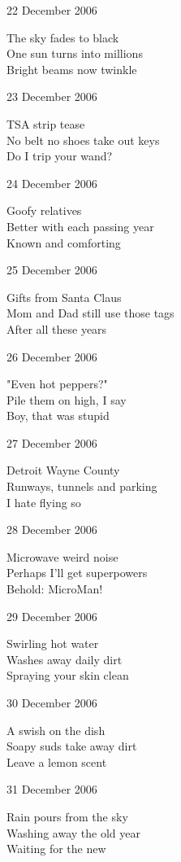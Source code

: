 \documentclass[12pt]{article}
\begin{document}
22 December 2006

The sky fades to black \\
One sun turns into millions \\
Bright beams now twinkle

23 December 2006

TSA strip tease \\
No belt no shoes take out keys \\
Do I trip your wand?

24 December 2006

Goofy relatives \\
Better with each passing year \\
Known and comforting

25 December 2006

Gifts from Santa Claus \\
Mom and Dad still use those tags \\
After all these years


\newpage

26 December 2006

"Even hot peppers?" \\
Pile them on high, I say \\
Boy, that was stupid

27 December 2006

Detroit Wayne County \\
Runways, tunnels and parking \\
I hate flying so

28 December 2006

Microwave weird noise \\
Perhaps I'll get superpowers \\
Behold: MicroMan!

29 December 2006

Swirling hot water \\
Washes away daily dirt \\
Spraying your skin clean

30 December 2006

A swish on the dish \\
Soapy suds take away dirt \\
Leave a lemon scent

31 December 2006

Rain pours from the sky \\
Washing away the old year \\
Waiting for the new

      
\newpage
\end{document}
